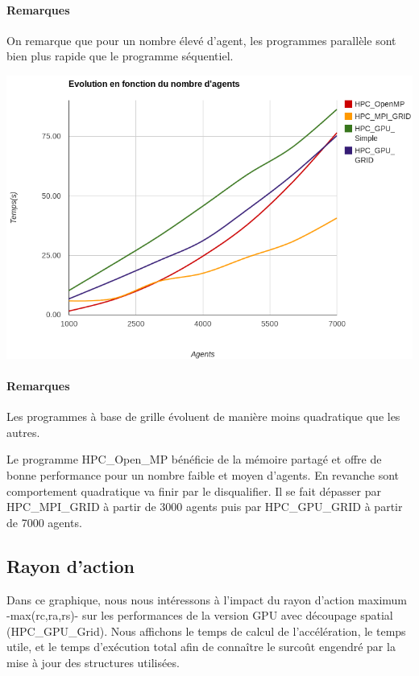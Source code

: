 \documentclass[liens,entete-ensimag,margeCorrection]{ensirapport}
\begin{document}
\paragraph{Remarques}

On remarque que pour un nombre élevé d'agent, les programmes parallèle sont bien plus rapide que le programme séquentiel.

\includegraphics[width=\linewidth]{ImageGlobalLight}

\paragraph{Remarques}

Les programmes à base de grille évoluent de manière moins quadratique que les autres.

Le programme HPC\_Open\_MP bénéficie de la mémoire partagé et offre de bonne performance pour un nombre faible et moyen d'agents.
En revanche sont comportement quadratique va finir par le disqualifier.
Il se fait dépasser par HPC\_MPI\_GRID à partir de 3000 agents puis par HPC\_GPU\_GRID à partir de 7000 agents.

\subsection{Rayon d'action}

Dans ce graphique, nous nous intéressons à l'impact du rayon d'action maximum -max(rc,ra,rs)- sur les performances de la version GPU avec découpage spatial (HPC\_GPU\_Grid).
Nous affichons le temps de calcul de l'accélération, le temps utile, et le temps d'exécution total afin de connaître le surcoût engendré par la mise à jour des structures utilisées.
\end{document}
